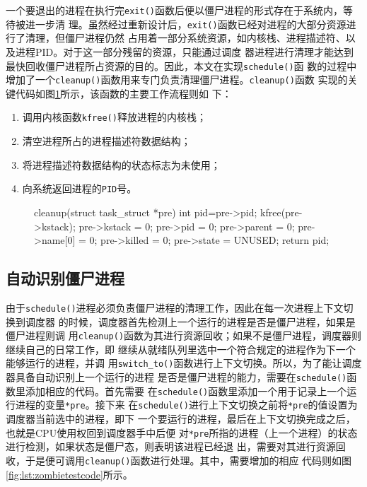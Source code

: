 \documentclass{swfuthesism}
\begin{document}
一个要退出的进程在执行完\texttt{exit()}函数后便以僵尸进程的形式存在于系统内，等待被进一步清
理。虽然经过重新设计后，\texttt{exit()}函数已经对进程的大部分资源进行了清理，但僵尸进程仍然
占用着一部分系统资源，如内核栈、进程描述符、以及进程PID。对于这一部分残留的资源，只能通过调度
器进程进行清理才能达到最快回收僵尸进程所占资源的目的。因此，本文在实现\texttt{schedule()}函
数的过程中增加了一个\texttt{cleanup()}函数用来专门负责清理僵尸进程。\texttt{cleanup()}函数
实现的关键代码如图\ref{fig:lst:cleanupcode}所示，该函数的主要工作流程则如
下：
\begin{enumerate}
\item 调用内核函数\texttt{kfree()}释放进程的内核栈；
\item 清空进程所占的进程描述符数据结构；
\item 将进程描述符数据结构的状态标志为未使用；
\item 向系统返回进程的\texttt{PID}号。
\end{enumerate}
\begin{figure}
  \begin{codeblock}
\begin{ccode}
cleanup(struct task_struct *pre)
{
  int pid=pre->pid;
  kfree(pre->kstack);
  pre->kstack = 0;
  pre->pid = 0;
  pre->parent = 0;
  pre->name[0] = 0;
  pre->killed = 0;
  pre->state = UNUSED;
  return pid;
}
\end{ccode}
  \end{codeblock}
  \label{fig:lst:cleanupcode}
\end{figure}

\subsection{自动识别僵尸进程}

由于\texttt{schedule()}进程必须负责僵尸进程的清理工作，因此在每一次进程上下文切换到调度器
的时候，调度器首先检测上一个运行的进程是否是僵尸进程，如果是僵尸进程则调
用\texttt{cleanup()}函数为其进行资源回收；如果不是僵尸进程，调度器则继续自己的日常工作，即
继续从就绪队列里选中一个符合规定的进程作为下一个能够运行的进程，并调
用\texttt{switch\_to()}函数进行上下文切换。所以，为了能让调度器具备自动识别上一个运行的进程
是否是僵尸进程的能力，需要在\texttt{schedule()}函数里添加相应的代码。首先需要
在\texttt{schedule()}函数里添加一个用于记录上一个运行进程的变量\texttt{*pre}。接下来
在\texttt{schedule()}进行上下文切换之前将\texttt{*pre}的值设置为调度器当前选中的进程，即下
一个要运行的进程，最后在上下文切换完成之后，也就是CPU使用权回到调度器手中后便
对\texttt{*pre}所指的进程（上一个进程）的状态进行检测，如果状态是僵尸态，则表明该进程已经退
出，需要对其进行资源回收，于是便可调用\texttt{cleanup()}函数进行处理。其中，需要增加的相应
代码则如图\ref{fig:lst:zombietestcode}所示。
\end{document}

